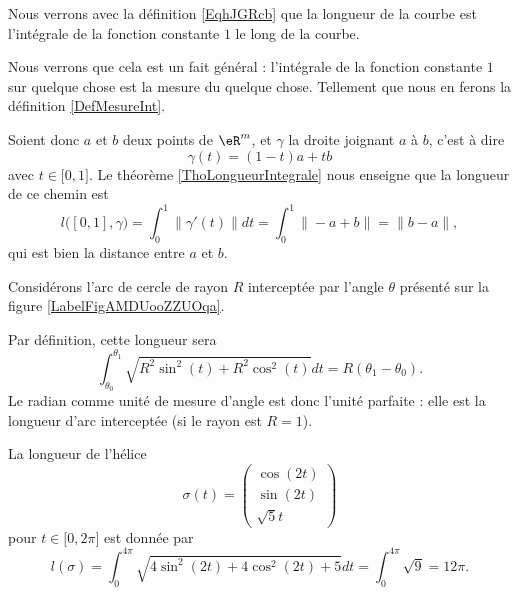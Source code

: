 \begin{remark}  \label{RemLongIntUn}
    Nous verrons avec la définition \eqref{EqhJGRcb} que la longueur de la courbe est l'intégrale de la fonction constante \( 1\) le long de la courbe.

    Nous verrons que cela est un fait général : l'intégrale de la fonction constante \( 1\) sur quelque chose est la mesure du quelque chose. Tellement que nous en ferons la définition \ref{DefMesureInt}.
\end{remark}

\begin{example}
Soient donc $a$ et $b$ deux points de $\eR^m$, et $\gamma$ la droite joignant $a$ à $b$, c'est à dire
\begin{equation}
    \gamma(t)=(1-t)a+tb
\end{equation}
avec $t\in\mathopen[ 0 , 1 \mathclose]$. Le théorème \ref{ThoLongueurIntegrale} nous enseigne que la longueur de ce chemin est
\begin{equation}
    l\big( [0,1],\gamma \big)=\int_0^1\| \gamma'(t) \|dt=\int_0^1\| -a+b \|=\| b-a \|,
\end{equation}
qui est bien la distance entre $a$ et $b$.
\end{example}

\begin{example}
    Considérons l'arc de cercle de rayon $R$ interceptée par l'angle $\theta$ présenté sur la figure \ref{LabelFigAMDUooZZUOqa}. %
\newcommand{\CaptionFigAMDUooZZUOqa}{Quelle est la longueur de la partie bleue de ce cercle de rayon $R$ ?}                                            
 
    
    Par définition, cette longueur sera
    \begin{equation}
        \int_{\theta_0}^{\theta_1}\sqrt{R^2\sin^2(t)+R^2\cos^2(t)}dt=R(\theta_1-\theta_0).
    \end{equation}
    Le radian comme unité de mesure d'angle est donc l'unité parfaite : elle est la longueur d'arc interceptée (si le rayon est $R=1$).
\end{example}

\begin{example}
    La longueur de l'hélice
    \begin{equation}
        \sigma(t)=\begin{pmatrix}
            \cos(2t)    \\ 
            \sin(2t)    \\ 
            \sqrt{5}t    
        \end{pmatrix}
    \end{equation}
    pour $t\in\mathopen[ 0 , 2\pi \mathclose]$ est donnée par
    \begin{equation}
        l(\sigma)=\int_0^{4\pi}\sqrt{4\sin^2(2t)+4\cos^2(2t)+5}dt=\int_0^{4\pi}\sqrt{9}=12\pi.
    \end{equation}
\end{example}

